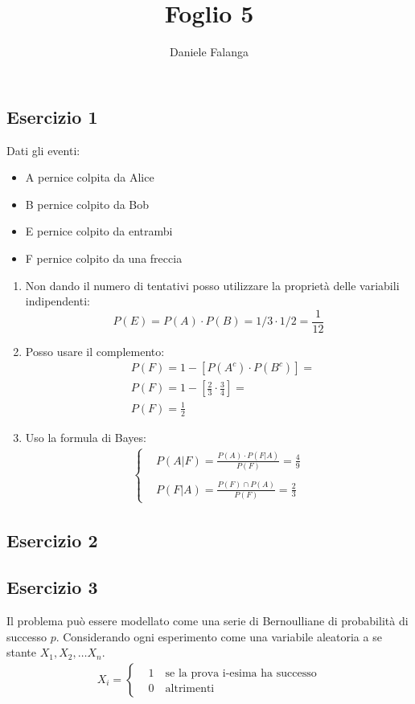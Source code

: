 \documentclass[12pt]{article}
\title{\textbf{Foglio 5}}
\author{Daniele Falanga}
\date{}
\begin{document}
\maketitle

\subsection*{Esercizio 1}
Dati gli eventi:
\begin{itemize}
    \item A pernice colpita da Alice
    \item B pernice colpito da Bob
    \item E pernice colpito da entrambi
    \item F pernice colpito da una freccia
\end{itemize}
\begin{enumerate}
    \item Non dando il numero di tentativi posso utilizzare la proprietà delle variabili indipendenti:
    \[
    P(E) = P(A)\cdot P(B) = 1/3 \cdot 1/2 = \frac{1}{12}   
    \]
    \item Posso usare il complemento:
    \begin{align*}
        &P(F) = 1-[P(A^c) \cdot P(B^c)] = \\
        &P(F) = 1 - \left[ \frac{2}{3} \cdot \frac{3}{4}\right] = \\
        &P(F) = \frac{1}{2}
    \end{align*}
    \item Uso la formula di Bayes:
    \begin{align*}
        \begin{cases}
            &P(A|F) = \frac{P(A)\cdot P(F|A)}{P(F)}  = \frac{4}{9}\\
            & \\
            &P(F|A) = \frac{P(F) \cap P(A)}{P(F)} = \frac{2}{3}
        \end{cases}
    \end{align*}    
\end{enumerate}


\subsection*{Esercizio 2}


\newpage
\subsection*{Esercizio 3}
Il problema può essere modellato come una serie di Bernoulliane di probabilità di successo \(p\). 
Considerando ogni esperimento come una variabile aleatoria a se stante \(X_1,X_2,\dots X_n\).
\begin{align*}
    X_i =
    \begin{cases}
        &1 \quad \text{se la prova i-esima ha successo} \\
        &0 \quad \text{altrimenti}
    \end{cases}
\end{align*}
\end{document}

